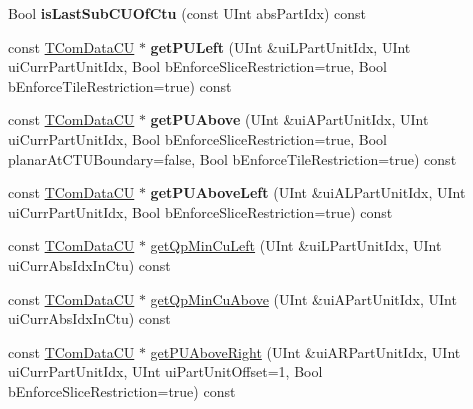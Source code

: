 \begin{DoxyCompactItemize}
\item 
\mbox{\label{class_t_com_data_c_u_a2ea597064b32065e2063f4ef2cd5df08}} 
Bool {\bfseries is\+Last\+Sub\+C\+U\+Of\+Ctu} (const U\+Int abs\+Part\+Idx) const
\item 
\mbox{\label{class_t_com_data_c_u_a271271d503febaa3d97abe8b2638365c}} 
const \hyperlink{class_t_com_data_c_u}{T\+Com\+Data\+CU} $\ast$ {\bfseries get\+P\+U\+Left} (U\+Int \&ui\+L\+Part\+Unit\+Idx, U\+Int ui\+Curr\+Part\+Unit\+Idx, Bool b\+Enforce\+Slice\+Restriction=true, Bool b\+Enforce\+Tile\+Restriction=true) const
\item 
\mbox{\label{class_t_com_data_c_u_acca9c31d21dcd8cf265ff1474f988d35}} 
const \hyperlink{class_t_com_data_c_u}{T\+Com\+Data\+CU} $\ast$ {\bfseries get\+P\+U\+Above} (U\+Int \&ui\+A\+Part\+Unit\+Idx, U\+Int ui\+Curr\+Part\+Unit\+Idx, Bool b\+Enforce\+Slice\+Restriction=true, Bool planar\+At\+C\+T\+U\+Boundary=false, Bool b\+Enforce\+Tile\+Restriction=true) const
\item 
\mbox{\label{class_t_com_data_c_u_a242cce544bc0e0e11739041be0cff97d}} 
const \hyperlink{class_t_com_data_c_u}{T\+Com\+Data\+CU} $\ast$ {\bfseries get\+P\+U\+Above\+Left} (U\+Int \&ui\+A\+L\+Part\+Unit\+Idx, U\+Int ui\+Curr\+Part\+Unit\+Idx, Bool b\+Enforce\+Slice\+Restriction=true) const
\item 
const \hyperlink{class_t_com_data_c_u}{T\+Com\+Data\+CU} $\ast$ \hyperlink{class_t_com_data_c_u_ac16f296ef1a88489c5aba12a635fc135}{get\+Qp\+Min\+Cu\+Left} (U\+Int \&ui\+L\+Part\+Unit\+Idx, U\+Int ui\+Curr\+Abs\+Idx\+In\+Ctu) const
\item 
const \hyperlink{class_t_com_data_c_u}{T\+Com\+Data\+CU} $\ast$ \hyperlink{class_t_com_data_c_u_a0f68185a0c2c0671e1c4afc790173b70}{get\+Qp\+Min\+Cu\+Above} (U\+Int \&ui\+A\+Part\+Unit\+Idx, U\+Int ui\+Curr\+Abs\+Idx\+In\+Ctu) const
\item 
\mbox{\label{class_t_com_data_c_u_a7899083f9a167b6f5f44e3ad5b57770e}} 
const \hyperlink{class_t_com_data_c_u}{T\+Com\+Data\+CU} $\ast$ \hyperlink{class_t_com_data_c_u_a7899083f9a167b6f5f44e3ad5b57770e}{get\+P\+U\+Above\+Right} (U\+Int \&ui\+A\+R\+Part\+Unit\+Idx, U\+Int ui\+Curr\+Part\+Unit\+Idx, U\+Int ui\+Part\+Unit\+Offset=1, Bool b\+Enforce\+Slice\+Restriction=true) const

\end{DoxyCompactItemize}

